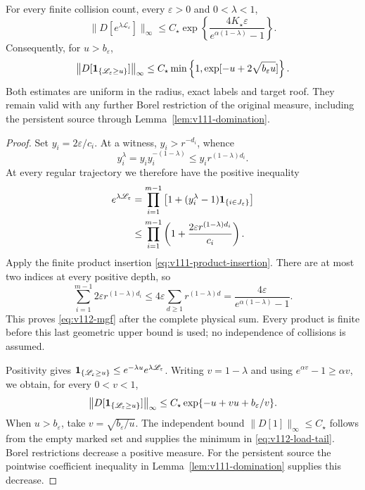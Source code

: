 \begin{theorem}
\label{thm:v112-load}
For every finite collision count, every $\varepsilon>0$ and
$0<\lambda<1$,
\begin{equation}\label{eq:v112-mgf}
 \bigl\|D[e^{\lambda\mathscr L_\varepsilon}]\bigr\|_\infty
 \le C_\star
   \exp\left\{\frac{4K_\star\varepsilon}
                         {e^{\alpha(1-\lambda)}-1}\right\}.
\end{equation}
Consequently, for $u>b_\varepsilon$,
\begin{equation}\label{eq:v112-load-tail}
 \bigl\|D[\mathbf1_{\{\mathscr L_\varepsilon\ge u\}}]\bigr\|_\infty
 \le C_\star\min\left\{1,
               \exp[-u+2\sqrt{b_\varepsilon u}]\right\}.
\end{equation}
Both estimates are uniform in the radius, exact labels and target
roof. They remain valid with any further Borel restriction of the
original measure, including the persistent source through
Lemma~\ref{lem:v111-domination}.
\end{theorem}
\begin{proof}
Set $y_i=2\varepsilon/c_i$. At a witness, $y_i>r^{-d_i}$, whence
\[
 y_i^\lambda
 =y_i y_i^{-(1-\lambda)}
 \le y_i r^{(1-\lambda)d_i}.
\]
At every regular trajectory we therefore have the positive inequality
\begin{align*}
 e^{\lambda\mathscr L_\varepsilon}
 &=\prod_{i=1}^{m-1}
       \left[1+(y_i^\lambda-1)\mathbf1_{\{i\in J_\varepsilon\}}\right]\\
 &\le\prod_{i=1}^{m-1}
                 \left(1+\frac{2\varepsilon r^{(1-\lambda)d_i}}{c_i}\right).
\end{align*}
Apply the finite product insertion
\eqref{eq:v111-product-insertion}. There are at most two indices
at every positive depth, so
\[
 \sum_{i=1}^{m-1}2\varepsilon r^{(1-\lambda)d_i}
 \le4\varepsilon\sum_{d\ge1}r^{(1-\lambda)d}
 =\frac{4\varepsilon}{e^{\alpha(1-\lambda)}-1}.
\]
This proves \eqref{eq:v112-mgf} after the complete physical sum.
Every product is finite before this last geometric upper bound is
used; no independence of collisions is assumed.

Positivity gives
$\mathbf1_{\{\mathscr L_\varepsilon\ge u\}}
 \le e^{-\lambda u}e^{\lambda\mathscr L_\varepsilon}$.
Writing $v=1-\lambda$ and using $e^{\alpha v}-1\ge\alpha v$,
we obtain, for every $0<v<1$,
\[
 \bigl\|D[\mathbf1_{\{\mathscr L_\varepsilon\ge u\}}]\bigr\|_\infty
 \le C_\star\exp\{-u+vu+b_\varepsilon/v\}.
\]
When $u>b_\varepsilon$, take $v=\sqrt{b_\varepsilon/u}$.
The independent bound $\|D[1]\|_\infty\le C_\star$ follows from
the empty marked set and supplies the minimum in
\eqref{eq:v112-load-tail}. Borel restrictions decrease a positive
measure. For the persistent source the pointwise coefficient
inequality in Lemma~\ref{lem:v111-domination} supplies this decrease.
\end{proof}

